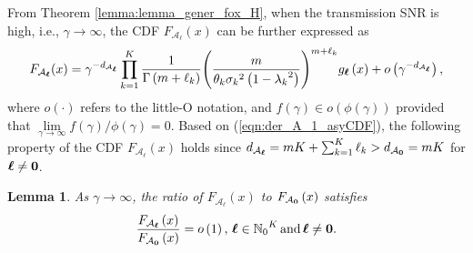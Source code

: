 \documentclass[12pt,onecolumn,draftcls]{IEEEtran}
\newcommand{\bs}{\boldsymbol}
\newtheorem{lemma}{Lemma}
\begin{document}
From Theorem \ref{lemma:lemma_gener_fox_H}, when the transmission SNR is high, i.e., $\gamma \to \infty$, the CDF ${F_{{{ {\mathcal A}}_{\bs{\ell}}}}}(x)$ can be further expressed as
\begin{equation}\label{eqn:der_A_1_asyCDF}
{F_{{{\cal A}_{\bs{\ell}}}}}(x) = {\gamma ^{ - {d_{{\mathcal A_{\bs{\ell}}}}}}}\prod\limits_{k = 1}^K {\frac{1}{{\Gamma \left( {m + {\ell_k}} \right)}}{{\left( {\frac{m}{{{\theta _k}{\sigma _k}^2\left( {1 - {\lambda _k}^2} \right)}}} \right)}^{m + {\ell_k}}}} {g_{\bs{\ell}}}\left( x \right) + o\left( {{\gamma ^{ - {d_{{\mathcal A_{\bs{\ell}}}}}}}} \right),
\end{equation}
where $o(\cdot)$ refers to the little-O notation, and $f(\gamma) \in o(\phi(\gamma))$ provided that $\lim \limits_{\gamma \to \infty}f(\gamma)/\phi(\gamma) = 0$. Based on (\ref{eqn:der_A_1_asyCDF}), the following property of the CDF ${F_{{{ {\mathcal A}}_{\bs{\ell}}}}}(x)$ holds since $d_{{ {\cal A}_{\bs{\ell}}}} = mK + \sum\nolimits_{k = 1}^K { { {\ell_k}} } > d_{{ {\cal A}_{\bf{0}}}} = mK$ for ${\bs{\ell} \ne \bf{0}}$.
\begin{lemma}\label{the:cdf_pdf_relatoin_hat}
As $\gamma \to \infty$, the ratio of ${{F_{{ {\mathcal A}_{\bs{\ell}}}}}\left( x \right)}$ to ${{F_{{ {\mathcal A}_{\bf{0}}}}}\left( x \right)}$ satisfies
\begin{equation}\label{eqn:F_AI_F_A0_rel_hat}
\frac{{{F_{{ {\cal A}_{\bs{\ell}}}}}\left( x \right)}}{{{F_{{ {\cal A}_{\bf{0}}}}}\left( x \right)}} = o\left( 1 \right),\, {{{\bs{\ell}}} \in {{\mathbb N}_0}^K} \,{\rm and }\, {\bs{\ell} \ne \bf{0}}.
\end{equation}
\end{lemma}
\end{document}
